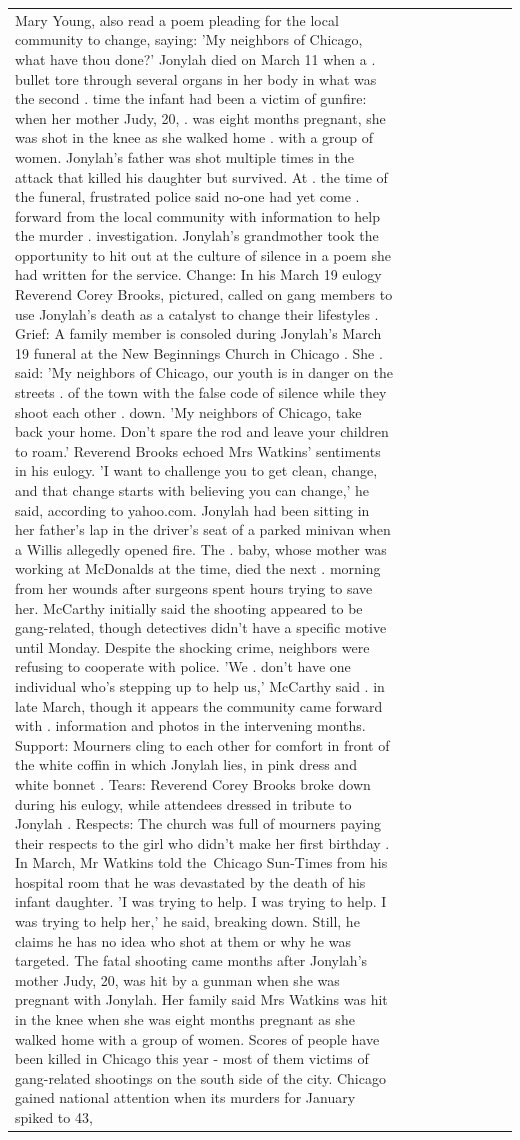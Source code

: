 \begin{table}[H]
\begin{tabular}{lllrlllll}
Mary Young, also read a poem pleading for the local community to change, saying: 'My neighbors of Chicago, what have thou done?' Jonylah died on March 11 when a . bullet tore through several organs in her body in what was the second . time the infant had been a victim of gunfire: when her mother Judy, 20, . was eight months pregnant, she was shot in the knee as she walked home . with a group of women. Jonylah's father was shot multiple times in the attack that killed his daughter but survived. At . the time of the funeral, frustrated police said no-one had yet come . forward from the local community with information to help the murder . investigation. Jonylah's grandmother took the opportunity to hit out at the culture of silence in a poem she had written for the service. Change: In his March 19 eulogy Reverend Corey Brooks, pictured, called on gang members to use Jonylah's death as a catalyst to change their lifestyles . Grief: A family member is consoled during Jonylah's March 19 funeral at the New Beginnings Church in Chicago . She . said: 'My neighbors of Chicago, our youth is in danger on the streets . of the town with the false code of silence while they shoot each other . down. 'My neighbors of Chicago, take back your home. Don't spare the rod and leave your children to roam.' Reverend Brooks echoed Mrs Watkins' sentiments in his eulogy. 'I want to challenge you to get clean, change, and that change starts with believing you can change,' he said, according to yahoo.com. Jonylah had been sitting in her father's lap in the driver's seat of a parked minivan when a Willis allegedly opened fire. The . baby, whose mother was working at McDonalds at the time, died the next . morning from her wounds after surgeons spent hours trying to save her. McCarthy initially said the shooting appeared to be gang-related, though detectives didn't have a specific motive until Monday. Despite the shocking crime, neighbors were refusing to cooperate with police. 'We . don't have one individual who's stepping up to help us,' McCarthy said . in late March, though it appears the community came forward with . information and photos in the intervening months. Support: Mourners cling to each other for comfort in front of the white coffin in which Jonylah lies, in pink dress and white bonnet . Tears: Reverend Corey Brooks broke down during his eulogy, while attendees dressed in tribute to Jonylah . Respects: The church was full of mourners paying their respects to the girl who didn't make her first birthday . In March, Mr Watkins told the Chicago Sun-Times from his hospital room that he was devastated by the death of his infant daughter. 'I was trying to help. I was trying to help. I was trying to help her,' he said, breaking down. Still, he claims he has no idea who shot at them or why he was targeted. The fatal shooting came months after Jonylah's mother Judy, 20, was hit by a gunman when she was pregnant with Jonylah. Her family said Mrs Watkins was hit in the knee when she was eight months pregnant as she walked home with a group of women. Scores of people have been killed in Chicago this year - most of them victims of gang-related shootings on the south side of the city. Chicago gained national attention when its murders for January spiked to 43, 
\end{tabular}
\end{table}
